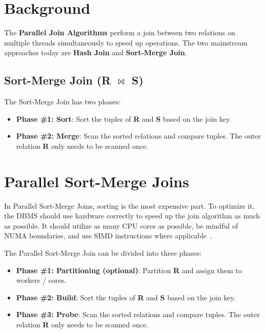 \documentclass[11pt]{article}
\begin{document}
\maketitle
\thispagestyle{plain}

\section{Background}
The \textbf{Parallel Join Algorithms} perform a join between two relations on multiple threads simultaneously to speed up operations. The two mainstream approaches today are \textbf{Hash Join} and \textbf{Sort-Merge Join}.

\subsection*{Sort-Merge Join (R $\bowtie$ S)}
The Sort-Merge Join has two phases:
\begin{itemize}
	\item \textbf{Phase \#1: Sort}:
	Sort the tuples of \textbf{R} and \textbf{S} based on the join key.
	
	\item \textbf{Phase \#2: Merge}:
	Scan the sorted relations and compare tuples.
	The outer relation \textbf{R} only needs to be scanned once.
\end{itemize}

\section{Parallel Sort-Merge Joins}
In Parallel Sort-Merge Joins, sorting is the most expensive part. To optimize it, the DBMS should use hardware correctly to speed up the join algorithm as much as possible. It should utilize as many CPU cores as possible, be mindful of NUMA boundaries, and use SIMD instructions where applicable~\cite{Balkesen2013}.

The Parallel Sort-Merge Join can be divided into three phases:
\begin{itemize}
	\item \textbf{Phase \#1: Partitioning (optional)}:
	Partition \textbf{R} and assign them to workers / cores.
	
	\item \textbf{Phase \#2: Build}:
	Sort the tuples of \textbf{R} and \textbf{S} based on the join key.
	
	\item \textbf{Phase \#3: Probe}:
	Scan the sorted relations and compare tuples.
	The outer relation \textbf{R} only needs to be scanned once.
\end{itemize}
\end{document}
